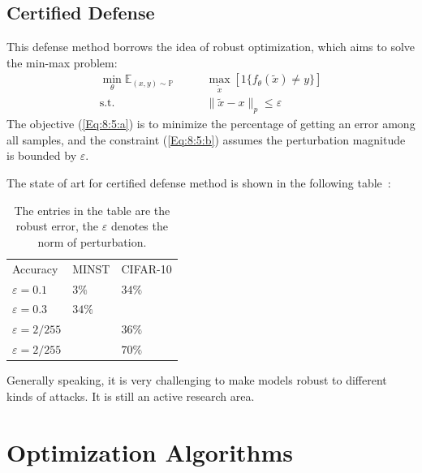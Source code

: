 \subsection{Certified Defense}
This defense method borrows the idea of robust optimization, which aims to solve the min-max problem:
\begin{subequations}
\begin{align}
\min_{\theta}\mathbb{E}_{(x,y)\sim\mathbb{P}}\qquad&\max_{\tilde{x}}\left[1\{f_\theta(\tilde{x})\ne y\}\right]\label{Eq:8:5:a}\\
\text{s.t.}\qquad&\|\tilde{x} - x\|_p\le\varepsilon\label{Eq:8:5:b}
\end{align}
\end{subequations}
The objective (\ref{Eq:8:5:a}) is to minimize the percentage of getting an error among all samples, and the constraint (\ref{Eq:8:5:b}) assumes the perturbation magnitude is bounded by $\varepsilon$.

The state of art for certified defense method is shown in the following table~\citep{SPA3327757}:
\begin{center}
\begin{table}[H]
\centering
\begin{tabular}{|l|l|l|}
\hline
Accuracy 				   & MINST & CIFAR-10   \\
 $\varepsilon=0.1$   & $3\%$   &     $34\%$  \\
 $\varepsilon=0.3$   & $34\%$   &      \\
 $\varepsilon=2/255$   &  &     $36\%$  \\
  $\varepsilon=2/255$   &  &     $70\%$  \\
  \hline
\end{tabular}
\caption{The entries in the table are the robust error,
the $\varepsilon$ denotes the norm of perturbation.
}
\end{table}
\end{center}
Generally speaking, it is very challenging to make models robust to different kinds of attacks. 
It is still an active research area.

\section{Optimization Algorithms}

